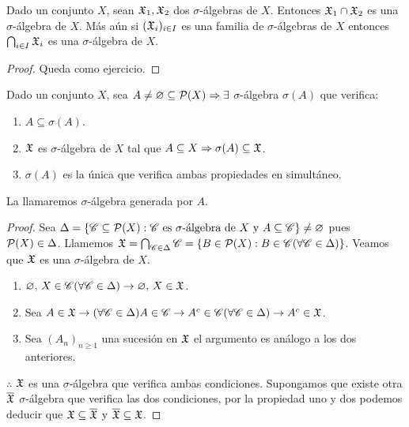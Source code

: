 \clearpage

\begin{lemma}
    Dado un conjunto $X$, sean $\mathfrak{X}_1, \mathfrak{X}_2$ dos $\sigma$-álgebras de $X$. Entonces $\mathfrak{X}_1 \cap \mathfrak{X}_2$ es una $\sigma$-álgebra de $X$.
    Más aún si $(\mathfrak{X}_i)_{i \in I}$ es una familia de $\sigma$-álgebras de $X$ entonces $\bigcap_{i \in I} \mathfrak{X}_i$ es una $\sigma$-álgebra de $X$.
    \begin{proof}
        Queda como ejercicio.
    \end{proof}
\end{lemma}

\begin{prop}
    Dado un conjunto $X$, sea $A \neq \varnothing \subseteq \mathcal{P}(X) \Rightarrow \exists$ $\sigma$-álgebra $\sigma(A)$ que verifica: \begin{enumerate}
        \item $A \subseteq \sigma(A)$.
        \item $\mathfrak{X}$ es $\sigma$-álgebra de $X$ tal que $A \subseteq X \Rightarrow \sigma(A) \subseteq \mathfrak{X}$.
        \item $\sigma(A)$ es la única que verifica ambas propiedades en simultáneo.
    \end{enumerate}
    La llamaremos $\sigma$-álgebra generada por $A$.

    \begin{proof}
        Sea $\Delta = \{ \mathscr{C} \subseteq \mathcal{P}(X) : \mathscr{C} \text{ es } \sigma \text{-álgebra de } X \text{ y } A \subseteq \mathscr{C} \} \neq \varnothing$ pues $\mathcal{P}(X) \in \Delta$.
        Llamemos $\mathfrak{X} = \bigcap_{\mathscr{C} \in \Delta} \mathscr{C} = \{ B \in \mathcal{P}(X) : B \in \mathscr{C} (\forall \mathscr{C} \in \Delta) \}$.
        Veamos que $\mathfrak{X}$ es una $\sigma$-álgebra de $X$.
        \begin{enumerate}
            \item $\varnothing\text{, } X \in \mathscr{C} (\forall \mathscr{C} \in \Delta) \to \varnothing\text{, } X \in \mathfrak{X}$.
            \item Sea $A \in \mathfrak{X} \to (\forall \mathscr{C} \in \Delta) A \in \mathscr{C} \to A^c \in \mathscr{C} (\forall \mathscr{C} \in \Delta) \to A^c \in \mathfrak{X}$.
            \item Sea $(A_n)_{n \geq 1}$ una sucesión en $\mathfrak{X}$ el argumento es análogo a los dos anteriores.
        \end{enumerate}
        $\therefore$ $\mathfrak{X}$ es una $\sigma$-álgebra que verifica ambas condiciones.
        Supongamos que existe otra $\overline{\mathfrak{X}}$ $\sigma$-álgebra que verifica las dos condiciones, por la propiedad uno y dos podemos deducir que $\mathfrak{X} \subseteq \overline{\mathfrak{X}}$ y $\overline{\mathfrak{X}} \subseteq \mathfrak{X}$.
    \end{proof}
\end{prop}

